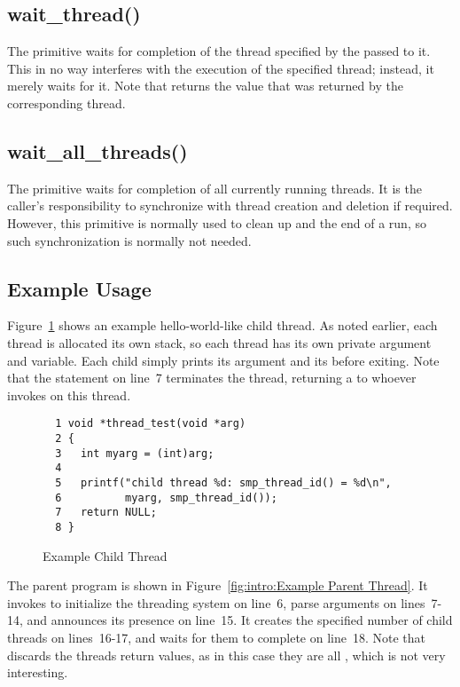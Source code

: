 \subsection{wait\_thread()}

The  primitive waits for completion of the thread
specified by the  passed to it.
This in no way interferes with the execution of the specified thread;
instead, it merely waits for it.
Note that  returns the value that was returned by
the corresponding thread.

\subsection{wait\_all\_threads()}

The 
primitive waits for completion of all currently running threads.
It is the caller's responsibility to synchronize with thread creation
and deletion if required.
However, this primitive is normally used to clean up and the end of
a run, so such synchronization is normally not needed.

\subsection{Example Usage}

Figure~\ref{fig:intro:Example Child Thread}
shows an example hello-world-like child thread.
As noted earlier, each thread is allocated its own stack, so
each thread has its own private  argument and  variable.
Each child simply prints its argument and its 
before exiting.
Note that the  statement on line~7 terminates the thread,
returning a  to whoever invokes  on this
thread.

\begin{figure}[htbp]
{ \scriptsize
\begin{verbatim}
  1 void *thread_test(void *arg)
  2 {
  3   int myarg = (int)arg;
  4
  5   printf("child thread %d: smp_thread_id() = %d\n",
  6          myarg, smp_thread_id());
  7   return NULL;
  8 }
\end{verbatim}
}
\caption{Example Child Thread}
\label{fig:intro:Example Child Thread}
\end{figure}

The parent program is shown in
Figure~\ref{fig:intro:Example Parent Thread}.
It invokes  to initialize the threading system on
line~6,
parse arguments on lines~7-14, and announces its presence on line~15.
It creates the specified number of child threads on lines~16-17,
and waits for them to complete on line~18.
Note that  discards the threads return values,
as in this case they are all , which is not very interesting.

